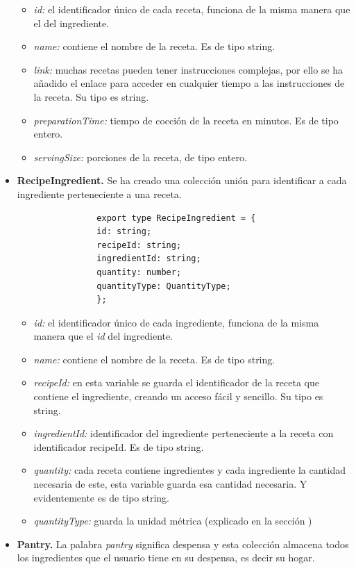 \documentclass[12pt,a4paper]{report} %
\begin{document}
\begin{itemize}
			\begin{itemize}
				\item \textit{id:} el identificador único de cada receta, funciona de la misma manera que el del ingrediente.
				\item \textit{name:} contiene el nombre de la receta. Es de tipo string.
				\item \textit{link:} muchas recetas pueden tener instrucciones complejas, por ello se ha añadido el enlace para acceder en cualquier tiempo a las instrucciones de la receta. Su tipo es string.
				\item \textit{preparationTime:} tiempo de cocción de la receta en minutos. Es de tipo entero.
				\item \textit{servingSize:} porciones de la receta, de tipo entero.
			\end{itemize}
		\item \textbf{RecipeIngredient.} Se ha creado una colección unión para identificar a cada ingrediente perteneciente a una receta.
		\\
			\begin{lstlisting}
				export type RecipeIngredient = {
				id: string;
				recipeId: string;
				ingredientId: string;
				quantity: number;
				quantityType: QuantityType;
				};
			\end{lstlisting}
			\begin{itemize}
				\item \textit{id:} el identificador único de cada ingrediente, funciona de la misma manera que el \textit{id} del ingrediente.
				\item \textit{name:} contiene el nombre de la receta. Es de tipo string.
				\item \textit{recipeId:} en esta variable se guarda el identificador de la receta que contiene el ingrediente, creando un acceso fácil y sencillo. Su tipo es string.
				\item \textit{ingredientId:} identificador del ingrediente perteneciente a la receta con identificador recipeId. Es de tipo string.
				\item \textit{quantity:} cada receta contiene ingredientes y cada ingrediente la cantidad necesaria de este, esta variable guarda esa cantidad necesaria. Y evidentemente es de tipo string.
				\item \textit{quantityType:} guarda la unidad métrica (explicado en la sección )
			\end{itemize}
		\item \textbf{Pantry.} La palabra \textit{pantry} significa despensa y esta colección almacena todos los ingredientes que el usuario tiene en su despensa, es decir su hogar.

\end{itemize}
\end{document}
